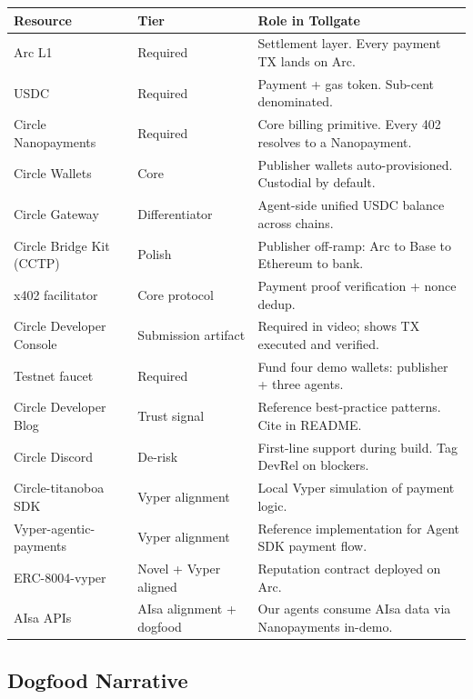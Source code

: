 \documentclass[11pt,a4paper]{article}
\begin{document}
\begin{table}[H]
\centering
\footnotesize
\begin{tabularx}{\textwidth}{@{} l l X @{}}
\toprule
\textbf{Resource} & \textbf{Tier} & \textbf{Role in Tollgate} \\
\midrule
Arc L1 & Required & Settlement layer. Every payment TX lands on Arc. \\
USDC & Required & Payment + gas token. Sub-cent denominated. \\
Circle Nanopayments & Required & Core billing primitive. Every 402 resolves to a Nanopayment. \\
Circle Wallets & Core & Publisher wallets auto-provisioned. Custodial by default. \\
Circle Gateway & Differentiator & Agent-side unified USDC balance across chains. \\
Circle Bridge Kit (CCTP) & Polish & Publisher off-ramp: Arc to Base to Ethereum to bank. \\
x402 facilitator & Core protocol & Payment proof verification + nonce dedup. \\
Circle Developer Console & Submission artifact & Required in video; shows TX executed and verified. \\
Testnet faucet & Required & Fund four demo wallets: publisher + three agents. \\
Circle Developer Blog & Trust signal & Reference best-practice patterns. Cite in README. \\
Circle Discord & De-risk & First-line support during build. Tag DevRel on blockers. \\
Circle-titanoboa SDK & Vyper alignment & Local Vyper simulation of payment logic. \\
Vyper-agentic-payments & Vyper alignment & Reference implementation for Agent SDK payment flow. \\
ERC-8004-vyper & Novel + Vyper aligned & Reputation contract deployed on Arc. \\
AIsa APIs & AIsa alignment + dogfood & Our agents consume AIsa data via Nanopayments in-demo. \\
\bottomrule
\end{tabularx}
\end{table}

\subsection{Dogfood Narrative}
\end{document}
